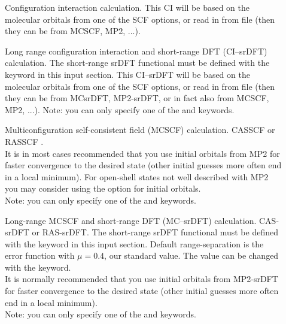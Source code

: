 \begin{description}
\begin{description}

\item[]
  Configuration interaction calculation.
  This CI will be based on the molecular orbitals from one of the SCF options, or
  read in from file (then they can be from MCSCF, MP2, ...).

\item[]
  Long range configuration interaction and short-range DFT (CI--srDFT) calculation.
  The short-range srDFT functional must be defined with the  keyword in this input section.
  This CI--srDFT will be based on the molecular orbitals from one of the SCF options, or
  read in from file (then they can be from MCsrDFT, MP2-srDFT, or in fact also from MCSCF, MP2, ...).
  Note: you can only specify one of the  and  keywords.

\item[]
  Multiconfiguration self-consistent field (MCSCF) calculation. CASSCF or RASSCF .\\
  It is in most cases recommended that you use initial orbitals from MP2 for faster convergence to
  the desired state (other initial guesses more often end in a local minimum).
  For open-shell states not well described with MP2 you may consider using the  option for initial orbitals.\\
  Note: you can only specify one of the  and  keywords.

\item[]
  Long-range MCSCF and short-range DFT (MC--srDFT) calculation. CAS-srDFT or RAS-srDFT.
  The short-range srDFT functional must be defined with the  keyword in this input section.
  Default range-separation is the error function with $\mu = 0.4$, our standard value.
  The value can be changed with the  keyword. \\
  It is normally recommended that you use initial orbitals from MP2-srDFT for faster convergence to
  the desired state (other initial guesses more often end in a local minimum). \\
  Note: you can only specify one of the  and  keywords.


\end{description}
\end{description}
